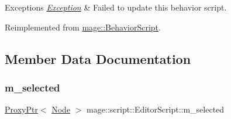 \begin{DoxyExceptions}{Exceptions}
{\em \mbox{\hyperlink{classmage_1_1_exception}{Exception}}} & Failed to update this behavior script. \\
\hline
\end{DoxyExceptions}


Reimplemented from \mbox{\hyperlink{classmage_1_1_behavior_script_a085634661326b59850c1111e537baa4e}{mage\+::\+Behavior\+Script}}.



\subsection{Member Data Documentation}
\mbox{\label{classmage_1_1script_1_1_editor_script_a60a8044379dfd203ad372dabb5c03380}} 
\subsubsection{\texorpdfstring{m\+\_\+selected}{m\_selected}}
{\footnotesize\ttfamily \mbox{\hyperlink{classmage_1_1_proxy_ptr}{Proxy\+Ptr}}$<$ \mbox{\hyperlink{classmage_1_1_node}{Node}} $>$ mage\+::script\+::\+Editor\+Script\+::m\+\_\+selected\hspace{0.3cm}{\ttfamily [private]}}

